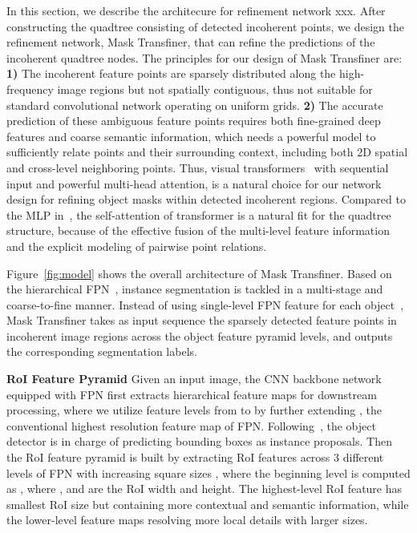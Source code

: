 \documentclass[10pt,twocolumn,letterpaper]{article}
\newcommand{\parsection}[1]{\vspace{1mm}\noindent\textbf{#1}}
\begin{document}
In this section, we describe the architecure for refinement network xxx.
After constructing the quadtree consisting of detected incoherent points, we design the refinement network, Mask Transfiner, that can refine the predictions of the incoherent quadtree nodes. The principles for our design of Mask Transfiner are: \textbf{1)} The incoherent feature points are sparsely distributed along the high-frequency image regions but not spatially contiguous, thus not suitable for standard convolutional network operating on uniform grids. \textbf{2)} The accurate prediction of these ambiguous feature points requires both fine-grained deep features and coarse semantic information, which needs a powerful model to sufficiently relate points and their surrounding context, including both 2D spatial and cross-level neighboring points. Thus, visual transformers~\cite{vaswani2017attention} with sequential input and powerful multi-head attention, is a natural choice for our network design for refining object masks within detected incoherent regions.
Compared to the MLP in~\cite{kirillov2020pointrend}, the self-attention of transformer is a natural fit for the quadtree structure, because of the effective fusion of the multi-level feature information and the explicit modeling of pairwise point relations. 

Figure~\ref{fig:model} shows the overall architecture of Mask Transfiner. Based on the hierarchical FPN~\cite{lin2017feature}, instance segmentation is tackled in a multi-stage and coarse-to-fine manner. Instead of using single-level FPN feature for each object~\cite{he2017mask}, Mask Transfiner takes as input sequence the sparsely detected feature points in incoherent image regions across the object feature pyramid levels, and outputs the corresponding segmentation labels.

\parsection{RoI Feature Pyramid} Given an input image, the CNN backbone network equipped with FPN first extracts hierarchical feature maps for downstream processing, where we utilize feature levels from  to  by further extending , the conventional highest resolution feature map of FPN. Following~\cite{he2017mask, dong2021solq}, the object detector is in charge of predicting bounding boxes as instance proposals. Then the RoI feature pyramid is built by extracting RoI features across 3 different levels  of FPN with increasing square sizes , where the beginning level  is computed as , where ,  and  are the RoI width and height. The highest-level RoI feature has smallest RoI size but containing more contextual and semantic information, while the lower-level feature maps resolving more local details with larger sizes.
\end{document}
